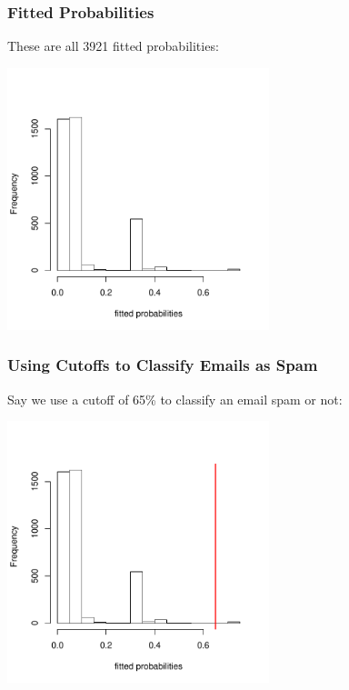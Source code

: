 \documentclass[slides]{beamer}
\newcommand{\blue}[1]{\textcolor{blue2}{#1}}
\begin{document}
\begin{frame}[fragile]
\frametitle{Fitted Probabilities}
These are all 3921 fitted probabilities:
\begin{center}
\includegraphics[width=3in]{figure/fitted.pdf}
\end{center}

\end{frame}


\begin{frame}[fragile]
\frametitle{Using Cutoffs to Classify Emails as Spam}

Say we use a cutoff of 65\% to \blue{classify} an email spam or not:
\begin{center}
\includegraphics[width=3in]{figure/fitted2.pdf}
\end{center}

\end{frame}
\end{document}
